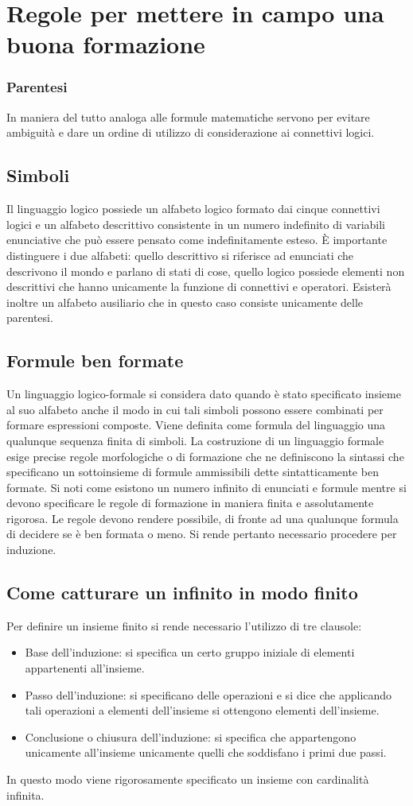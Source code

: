 \section{Regole per mettere in campo una buona formazione}
\subsubsection{Parentesi}
In maniera del tutto analoga alle formule matematiche servono per evitare ambiguit\`a e dare un ordine di utilizzo di considerazione ai connettivi logici.
\subsection{Simboli}
Il linguaggio logico possiede un alfabeto logico formato dai cinque connettivi logici e un alfabeto descrittivo consistente in un numero indefinito di variabili enunciative che pu\`o essere pensato come 
indefinitamente esteso. \`E importante distinguere i due alfabeti: quello descrittivo si riferisce ad enunciati che descrivono il mondo e parlano di stati di cose, quello logico possiede elementi non descrittivi che 
hanno unicamente la funzione di connettivi e operatori. Esister\`a inoltre un alfabeto ausiliario che in questo caso consiste unicamente delle parentesi.
\subsection{Formule ben formate}
Un linguaggio logico-formale si considera dato quando \`e stato specificato insieme al suo alfabeto anche il modo in cui tali simboli possono essere combinati per formare espressioni composte. Viene definita 
come formula del linguaggio una qualunque sequenza finita di simboli. La costruzione di un linguaggio formale esige precise regole morfologiche o di formazione che ne definiscono la sintassi che specificano 
un sottoinsieme di formule ammissibili dette sintatticamente ben formate. Si noti come esistono un numero infinito di enunciati e formule mentre si devono specificare le regole di formazione in 
maniera finita e assolutamente rigorosa. Le regole devono rendere possibile, di fronte ad una qualunque formula di decidere se \`e ben formata o meno. Si rende pertanto necessario procedere per induzione. 
\subsection{Come catturare un infinito in modo finito}
Per definire un insieme finito si rende necessario l'utilizzo di tre clausole:
\begin{itemize}
\item Base dell'induzione: si specifica un certo gruppo iniziale di elementi appartenenti all'insieme.
\item Passo dell'induzione: si specificano delle operazioni e si dice che applicando tali operazioni a elementi dell'insieme si ottengono elementi 
dell'insieme.
\item Conclusione o chiusura dell'induzione: si specifica che appartengono unicamente all'insieme unicamente quelli che soddisfano i primi due passi.
\end{itemize}
In questo modo viene rigorosamente specificato un insieme con cardinalit\`a infinita.
